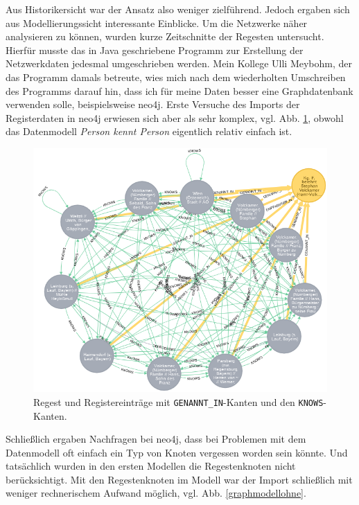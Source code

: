 \documentclass[ngerman,]{scrreprt}
\begin{document}
Aus Historikersicht war der Ansatz also weniger zielführend. Jedoch ergaben sich aus Modellierungssicht interessante Einblicke. Um die Netzwerke näher analysieren zu können, wurden kurze Zeitschnitte der Regesten untersucht. Hierfür musste das in Java geschriebene Programm zur Erstellung der Netzwerkdaten jedesmal umgeschrieben werden. Mein Kollege Ulli Meybohm, der das Programm damals betreute, wies mich nach dem wiederholten Umschreiben des Programms darauf hin, dass ich für meine Daten besser eine Graphdatenbank verwenden solle, beispielsweise neo4j. Erste Versuche des Imports der Registerdaten in neo4j erwiesen sich aber als sehr komplex, vgl. Abb. \ref{regestregister}, obwohl das Datenmodell \emph{Person kennt Person} eigentlich relativ einfach ist.

\begin{figure}
\centering
\includegraphics{Bilder/1zu1-Beziehungen-Register-Regest.png}
\caption{Regest und Registereinträge mit \texttt{GENANNT\_IN}-Kanten und den \texttt{KNOWS}-Kanten.}
\label{regestregister}
\end{figure}

Schließlich ergaben Nachfragen bei neo4j, dass bei Problemen mit dem Datenmodell oft einfach ein Typ von Knoten vergessen worden sein könnte. Und tatsächlich wurden in den ersten Modellen die Regestenknoten nicht berücksichtigt. Mit den Regestenknoten im Modell war der Import schließlich mit weniger rechnerischem Aufwand möglich, vgl. Abb. \ref{graphmodellohne}.
\end{document}
